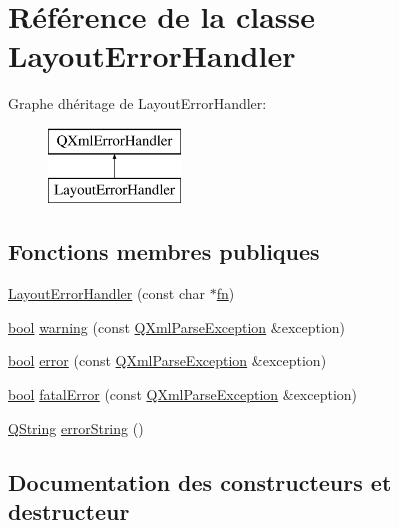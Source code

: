 \hypertarget{class_layout_error_handler}{}\section{Référence de la classe Layout\+Error\+Handler}
\label{class_layout_error_handler}
Graphe d\textquotesingle{}héritage de Layout\+Error\+Handler\+:\begin{figure}[H]
\begin{center}
\leavevmode
\includegraphics[height=2.000000cm]{class_layout_error_handler}
\end{center}
\end{figure}
\subsection*{Fonctions membres publiques}
\begin{DoxyCompactItemize}
\item 
\hyperlink{class_layout_error_handler_ab8c68291771ab718868961ed340cb97b}{Layout\+Error\+Handler} (const char $\ast$\hyperlink{tclscanner_8cpp_a9ffad97216456d27984aacce395adf85}{fn})
\item 
\hyperlink{qglobal_8h_a1062901a7428fdd9c7f180f5e01ea056}{bool} \hyperlink{class_layout_error_handler_a463dfca8796fee3c40a08817d1af64be}{warning} (const \hyperlink{class_q_xml_parse_exception}{Q\+Xml\+Parse\+Exception} \&exception)
\item 
\hyperlink{qglobal_8h_a1062901a7428fdd9c7f180f5e01ea056}{bool} \hyperlink{class_layout_error_handler_a7981be5cbf89e7f5bf27b3d75a821726}{error} (const \hyperlink{class_q_xml_parse_exception}{Q\+Xml\+Parse\+Exception} \&exception)
\item 
\hyperlink{qglobal_8h_a1062901a7428fdd9c7f180f5e01ea056}{bool} \hyperlink{class_layout_error_handler_aca31cecb0d737ede70e22c86d038bbb4}{fatal\+Error} (const \hyperlink{class_q_xml_parse_exception}{Q\+Xml\+Parse\+Exception} \&exception)
\item 
\hyperlink{class_q_string}{Q\+String} \hyperlink{class_layout_error_handler_a042664a153147e99f4ee0cb3bdf76418}{error\+String} ()
\end{DoxyCompactItemize}


\subsection{Documentation des constructeurs et destructeur}
\hypertarget{class_layout_error_handler_ab8c68291771ab718868961ed340cb97b}{}
